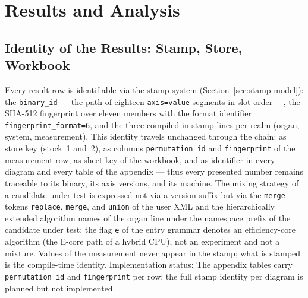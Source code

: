 \section{Results and Analysis}\label{sec:eval-results}
\subsection{Identity of the Results: Stamp, Store, Workbook}\label{sec:eval-identity}
Every result row is identifiable via the stamp system (Section~\ref{sec:stamp-model}): the
\texttt{binary\_id} --- the path of eighteen \texttt{axis=value} segments in slot order ---, the
SHA-512 fingerprint over eleven members with the format identifier \texttt{fingerprint\_format=6},
and the three compiled-in stamp lines per realm (organ, system, measurement). This identity travels
unchanged through the chain: as store key (stock~1 and~2), as columns \texttt{permutation\_id} and
\texttt{fingerprint} of the measurement row, as sheet key of the workbook, and as identifier in every
diagram and every table of the appendix --- thus every presented number remains traceable to its
binary, its axis versions, and its machine. The mixing strategy of a candidate under test is expressed not via a
version suffix but via the \texttt{merge} tokens \texttt{replace}, \texttt{merge}, and
\texttt{union} of the user XML and the hierarchically extended algorithm names of the organ line
under the namespace prefix of the candidate under test; the flag \texttt{e} of the entry grammar denotes an
efficiency-core algorithm (the E-core path of a hybrid CPU), not an experiment and not a mixture.
Values of the measurement never appear in the stamp; what is stamped is the compile-time identity.
Implementation status: The appendix tables carry \texttt{permutation\_id} and
\texttt{fingerprint} per row; the full stamp identity per diagram is planned but not implemented.

